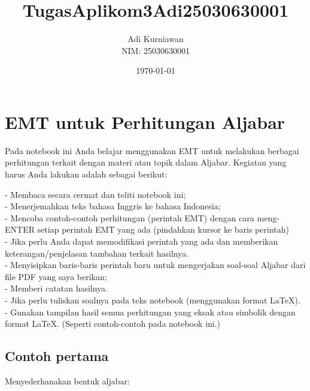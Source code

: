 \documentclass{article}
\title{TugasAplikom3Adi25030630001}
\author{Adi Kurniawan \\ NIM: 25030630001}
\date{\today}
\newenvironment{eulernotebook}{\par}{\par}
\newcommand{\eulerheading}[1]{\section{#1}}
\newcommand{\eulersubheading}[1]{\subsection{#1}}
\newenvironment{eulercomment}{\par\medskip}{\par\medskip}
\begin{document}
\maketitle

\begin{eulernotebook}
\eulerheading{EMT untuk Perhitungan Aljabar}
\begin{eulercomment}
Pada notebook ini Anda belajar menggunakan EMT untuk melakukan
berbagai perhitungan terkait dengan materi atau topik dalam Aljabar.
Kegiatan yang harus Anda lakukan adalah sebagai berikut:

- Membaca secara cermat dan teliti notebook ini;\\
- Menerjemahkan teks bahasa Inggris ke bahasa Indonesia;\\
- Mencoba contoh-contoh perhitungan (perintah EMT) dengan cara
meng-ENTER setiap perintah EMT yang ada (pindahkan kursor ke baris
perintah)\\
- Jika perlu Anda dapat memodifikasi perintah yang ada dan memberikan
keterangan/penjelasan tambahan terkait hasilnya.\\
- Menyisipkan baris-baris perintah baru untuk mengerjakan soal-soal
Aljabar dari file PDF yang saya berikan;\\
- Memberi catatan hasilnya.\\
- Jika perlu tuliskan soalnya pada teks notebook (menggunakan format
LaTeX).\\
- Gunakan tampilan hasil semua perhitungan yang eksak atau simbolik
dengan format LaTeX. (Seperti contoh-contoh pada notebook ini.)

\end{eulercomment}
\eulersubheading{Contoh pertama}
\begin{eulercomment}
Menyederhanakan bentuk aljabar:


\end{eulercomment}
\end{eulernotebook}
\end{document}
